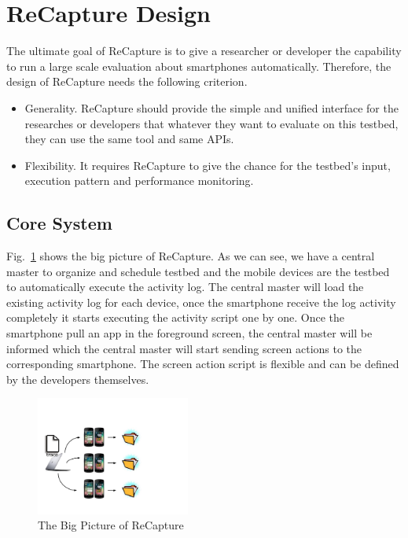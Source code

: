 \section{ReCapture Design}\label{sec:design}
The ultimate goal of ReCapture is to give a researcher or developer the capability to run a large scale evaluation about smartphones automatically. Therefore, the design of ReCapture needs the following criterion.
\begin{itemize}
\item Generality. ReCapture should provide the simple and unified interface for the researches or developers that whatever they want to evaluate on this testbed, they can use the same tool and same APIs.
\item Flexibility. It requires ReCapture to give the chance for the testbed's input, execution pattern and performance monitoring.
\end{itemize}

\subsection{Core System}
Fig.~\ref{fig:big} shows the big picture of ReCapture. As we can see, we have a central master to organize and schedule testbed and the mobile devices are the testbed to automatically execute the activity log. The central master will load the existing activity log for each device, once the smartphone receive the log activity completely it starts executing the activity script one by one. Once the smartphone pull an app in the foreground screen, the central master will be informed which the central master will start sending screen actions to the corresponding smartphone. The screen action script is flexible and can be defined by the developers themselves.

\begin{figure}
\centering
\includegraphics[width=0.45\textwidth]{figures/big-picture.pdf}
\caption{The Big Picture of ReCapture}
\label{fig:big}
\end{figure}

